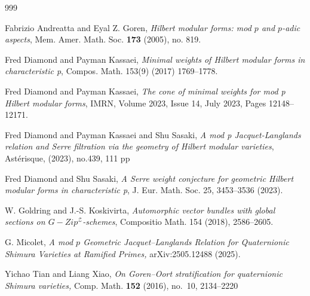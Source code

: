 \documentclass[11pt,pdflatex]{amsart}
\theoremstyle{plain}
\theoremstyle{definition}
\theoremstyle{plain}
\theoremstyle{definition}
\theoremstyle{remark}
\numberwithin{equation}{section}
\numberwithin{figure}{section} \numberwithin{table}{subsection}
\newcommand{\calZ}{{\mathcal{Z}}}
\begin{document}
\begin{thebibliography}{999}


 Fabrizio Andreatta and Eyal Z. Goren, \textit{Hilbert modular forms: mod $p$
and $p$-adic aspects}, Mem. Amer. Math. Soc. {\bf 173} (2005), no. 819.

 Fred Diamond and Payman Kassaei, \textit{Minimal weights of Hilbert modular forms in characteristic p}, Compos. Math. 153(9) (2017) 1769–1778.

 
 Fred Diamond and Payman Kassaei, \textit{The cone of minimal weights for mod p Hilbert modular forms}, IMRN, Volume 2023, Issue 14, July 2023, Pages 12148–12171.

 Fred Diamond and Payman Kassaei and Shu Sasaki, \textit{A mod p Jacquet-Langlands relation and Serre filtration via the geometry of Hilbert modular varieties}, Ast\'erisque, (2023), no.439, 111 pp

 Fred Diamond and  Shu Sasaki, \textit{A Serre weight conjecture for geometric Hilbert modular forms in characteristic p},  J. Eur. Math. Soc. 25, 3453–3536 (2023).

 

 

 W. Goldring and J.-S. Koskivirta, \textit{Automorphic vector bundles with global sections on $G-Zip^\calZ$-schemes}, Compositio Math. 154 (2018), 2586–2605.

 
 

 G. Micolet, \textit{A mod $p$ Geometric Jacquet--Langlands Relation
for Quaternionic Shimura Varieties at Ramified
Primes,} arXiv:2505.12488  (2025).


  Yichao Tian and Liang Xiao, \textit{On Goren--Oort stratification for quaternionic
Shimura varieties,} Comp. Math. {\bf 152} (2016), no.~10, 2134--2220

\end{thebibliography}
\end{document}
